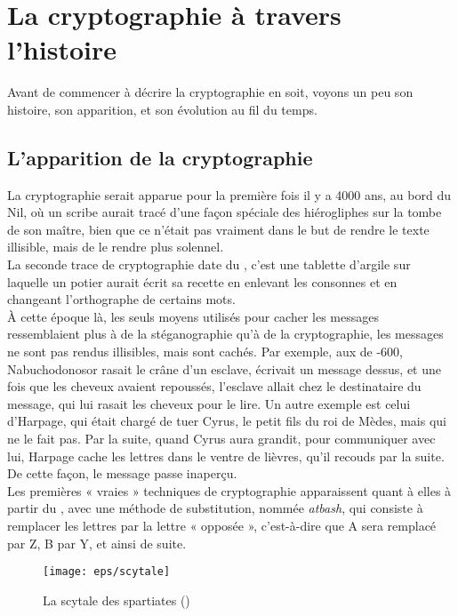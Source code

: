 \chapter{La cryptographie à travers l'histoire}
Avant de commencer à décrire la cryptographie en soit, voyons un peu
son histoire, son apparition, et son évolution au fil du temps.

\section{L'apparition de la cryptographie}
La cryptographie serait apparue pour la première fois il y a 4000 ans,
au bord du Nil, où un scribe aurait tracé d'une façon spéciale des
hiérogliphes sur la tombe de son maître, bien que ce n'était pas
vraiment dans le but de rendre le texte illisible, mais de le rendre
plus solennel. \\

La seconde trace de cryptographie date du , c'est une tablette
d'argile sur laquelle un potier aurait écrit sa recette en enlevant
les consonnes et en changeant l'orthographe de certains mots. \\

À cette époque là, les seuls moyens utilisés pour cacher les messages
ressemblaient plus à de la stéganographie qu'à de la cryptographie,
les messages ne sont pas rendus illisibles, mais sont cachés. Par
exemple, aux de -600, Nabuchodonosor rasait le crâne d'un esclave,
écrivait un message dessus, et une fois que les cheveux avaient
repoussés, l'esclave allait chez le destinataire du message, qui lui
rasait les cheveux pour le lire. Un autre exemple est celui d'Harpage,
qui était chargé de tuer Cyrus, le petit fils du roi de Mèdes, mais
qui ne le fait pas. Par la suite, quand Cyrus aura grandit, pour
communiquer avec lui, Harpage cache les lettres dans le ventre de
lièvres, qu'il recouds par la suite. De cette façon, le message passe
inaperçu. \\

Les premières « vraies » techniques de cryptographie apparaissent
quant à elles à partir du , avec une méthode de substitution,
nommée \emph{atbash}, qui consiste à remplacer les lettres par la
lettre « opposée », c'est-à-dire que A sera remplacé par Z, B par Y,
et ainsi de suite. \\

\begin{figure}[h]
  \begin{center}
    \texttt{[image: eps/scytale]}
  \end{center}
  \caption{La scytale des spartiates ()}
  \label{fig:scytale}
\end{figure}
  
